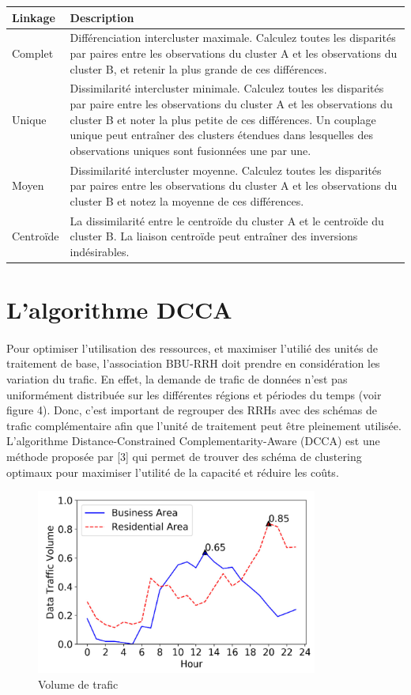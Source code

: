 \documentclass{report}
\begin{document}
\begin{tabularx}{\linewidth}{|x|X|}
   \hline
  Linkage & Description  \\
  \hline
  Complet & Différenciation intercluster maximale. Calculez toutes les disparités par paires entre les observations du cluster A et les observations du cluster B, et retenir la plus grande de ces différences. \\
  \hline
  Unique & Dissimilarité intercluster minimale. Calculez toutes les disparités par paire entre les observations du cluster A et les observations du cluster B et noter la plus petite de ces différences. Un couplage unique peut entraîner des clusters étendues dans lesquelles des observations uniques sont fusionnées une par une. \\
  \hline
  Moyen & Dissimilarité intercluster moyenne. Calculez toutes les disparités par paires entre les observations du cluster A et les observations du cluster B et notez la moyenne de ces différences. \\
  \hline
  Centroïde & La dissimilarité entre le centroïde du cluster A et le centroïde du cluster B. La liaison centroïde peut entraîner des inversions indésirables. \\
  \hline
\end{tabularx}

\section{L'algorithme DCCA}
\paragraph{} 
Pour optimiser l'utilisation des ressources, et maximiser l'utilié des unités de traitement de base, l'association BBU-RRH doit prendre 
en considération les variation du trafic. En effet, la demande de trafic de données n'est pas uniformément distribuée sur les différentes régions et périodes du temps (voir figure 4).
Donc, c'est important de regrouper des RRHs avec des schémas de trafic complémentaire afin que l'unité de traitement peut être pleinement 
utilisée. L'algorithme Distance-Constrained Complementarity-Aware (DCCA) est une méthode proposée par [3]
qui permet de trouver des schéma de clustering optimaux pour maximiser l'utilité de la capacité et réduire les coûts.

\begin{figure}[h]
  \centering
  \includegraphics[width=25em]{images/trafic.png}
  \caption{Volume de trafic}
\end{figure} \\
\end{document}
